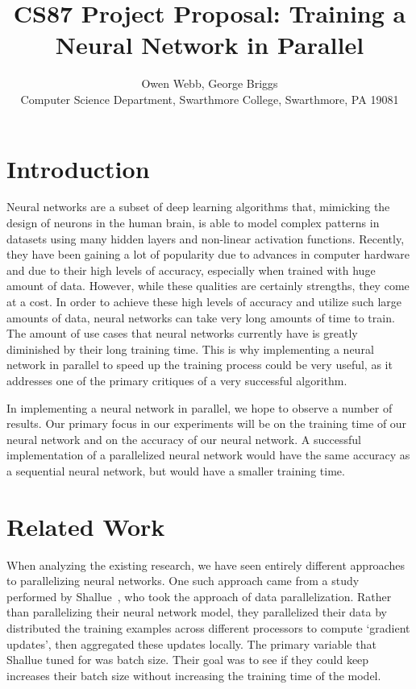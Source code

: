 \documentclass[11pt]{article}
\begin{document}
\title{CS87 Project Proposal: Training a Neural Network in Parallel}

\author{Owen Webb, George Briggs \\ 
Computer Science Department, Swarthmore College, Swarthmore, PA  19081}

\maketitle

\section {Introduction}\label{intro} 

Neural networks are a subset of deep learning algorithms that, mimicking the design of neurons in the human brain, is able to model complex patterns in datasets using many hidden layers and non-linear activation functions. Recently, they have been gaining a lot of popularity due to advances in computer hardware and due to their high levels of accuracy, especially when trained with huge amount of data. However, while these qualities are certainly strengths, they come at a cost. In order to achieve these high levels of accuracy and utilize such large amounts of data, neural networks can take very long amounts of time to train. The amount of use cases that neural networks currently have is greatly diminished by their long training time. This is why implementing a neural network in parallel to speed up the training process could be very useful, as it addresses one of the primary critiques of a very successful algorithm. 

In implementing a neural network in parallel, we hope to observe a number of results. Our primary focus in our experiments will be on the training time of our neural network and on the accuracy of our neural network. A successful implementation of a parallelized neural network would have the same accuracy as a sequential neural network, but would have a smaller training time.

\section {Related Work}\label{rel}

When analyzing the existing research, we have seen entirely different approaches to parallelizing neural networks. One such approach came from a study performed by  Shallue~\cite{Shallue:NNTraining}, who took the approach of data parallelization. Rather than parallelizing their neural network model, they parallelized their data by distributed the training examples across different processors to compute ‘gradient updates’, then aggregated these updates locally. The primary variable that Shallue tuned for was batch size. Their goal was to see if they could keep increases their batch size without increasing the training time of the model.
\end{document}

